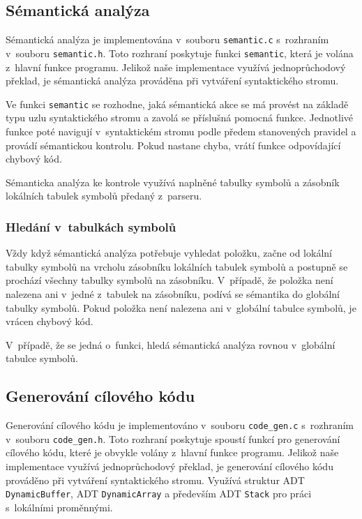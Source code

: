 \documentclass[a4paper, 11pt]{article}
\begin{document}
	\subsection{Sémantická analýza}
	Sémantická analýza je implementována v~souboru \texttt{semantic.c} s~rozhraním v~souboru \texttt{semantic.h}. Toto rozhraní poskytuje funkci \texttt{semantic}, která je volána z~hlavní funkce programu. Jelikož naše implementace využívá jednoprůchodový překlad, je sémantická analýza prováděna při vytváření syntaktického stromu.
	\par\noindent Ve funkci \texttt{semantic} se rozhodne, jaká sémantická akce se má provést na základě typu uzlu syntaktického stromu a zavolá se příslušná pomocná funkce. Jednotlivé funkce poté navigují v~syntaktickém stromu podle předem stanovených pravidel a provádí sémantickou kontrolu. Pokud nastane chyba, vrátí funkce odpovídající chybový kód.
	\par\noindent Sémanticka analýza ke kontrole využívá naplněné tabulky symbolů a zásobník lokálních tabulek symbolů předaný z~parseru.
	\subsubsection{Hledání v~tabulkách symbolů}
	Vždy když sémantická analýza potřebuje vyhledat položku, začne od lokální tabulky symbolů na vrcholu zásobníku lokálních tabulek symbolů a postupně se prochází všechny tabulky symbolů na zásobníku. V~případě, že položka není nalezena ani v~jedné z~tabulek na zásobníku, podívá se sémantika do globální tabulky symbolů.
	Pokud položka není nalezena ani v~globální tabulce symbolů, je vrácen chybový kód.
	\par\noindent V~případě, že se jedná o~funkci, hledá sémantická analýza rovnou v~globální tabulce symbolů. 

	\subsection{Generování cílového kódu}
	\label{sec:gen}

	Generování cílového kódu je implementováno v~souboru \texttt{code\_gen.c} s~rozhraním v~souboru \texttt{code\_gen.h}. Toto rozhraní poskytuje spoustí funkcí pro generování cílového kódu, které je obvykle volány z~hlavní funkce programu. Jelikož naše implementace využívá jednoprůchodový překlad, je generování cílového kódu pro\-váděno při vytváření syntaktického stromu.
	Využívá struktur ADT \texttt{DynamicBuffer}, ADT \texttt{DynamicArray} a především ADT \texttt{Stack} pro práci s~lokálními proměnnými. 
\end{document}
